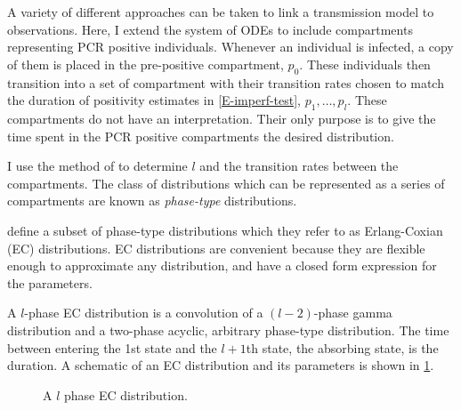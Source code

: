 \documentclass[thesis.tex]{subfiles}
\begin{document}
A variety of different approaches can be taken to link a transmission model to observations.
Here, I extend the system of ODEs to include compartments representing PCR positive individuals.
Whenever an individual is infected, a copy of them is placed in the pre-positive compartment, $p_0$.
These individuals then transition into a set of compartment with their transition rates chosen to match the duration of positivity estimates in \cref{E-imperf-test}, $p_1, \dots, p_l$.
These compartments do not have an interpretation.
Their only purpose is to give the time spent in the PCR positive compartments the desired distribution.


I use the method of \textcite{osogamiClosed} to determine $l$ and the transition rates between the compartments.
The class of distributions which can be represented as a series of compartments are known as \emph{phase-type} distributions.

\Textcite{osogamiClosed} define a subset of phase-type distributions which they refer to as Erlang-Coxian (EC) distributions.
EC distributions are convenient because they are flexible enough to approximate any distribution, and have a closed form expression for the parameters.

A $l$-phase EC distribution is a convolution of a $(l-2)$-phase gamma distribution and a two-phase acyclic, arbitrary phase-type distribution.
The time between entering the 1st state and the $l+1$th state, the absorbing state, is the duration.
A schematic of an EC distribution and its parameters is shown in \cref{SEIR:fig:EC}.

\begin{figure}
\caption{A $l$ phase EC distribution.}
\label{SEIR:fig:EC}
\end{figure}
\end{document}

